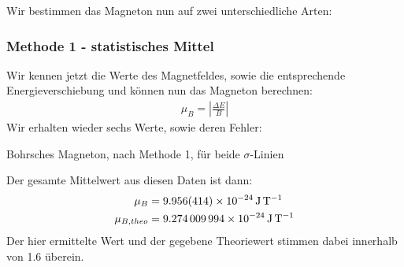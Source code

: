         Wir bestimmen das Magneton nun auf zwei unterschiedliche Arten:

        \subsubsection{Methode 1 - statistisches Mittel}
          Wir kennen jetzt die Werte des Magnetfeldes, sowie die entsprechende Energieverschiebung und können nun das Magneton berechnen:
          \begin{align}
            \mu_B=\left| \frac{\Delta E}{B} \right|
          \end{align}
          Wir erhalten wieder sechs Werte, sowie deren Fehler:
          \begin{table}[H]
            \centering
            
            \caption{Bohrsches Magneton, nach Methode 1, für beide $\sigma$-Linien}
            \label{tab::2}
          \end{table}
          Der gesamte Mittelwert aus diesen Daten ist dann:
          \begin{align}
            \mu_B         &= \SI{9.956+-0.414e-24}{\joule\per\tesla}\\
            \mu_{B, theo} &= \SI{9.274009994e-24}{\joule\per\tesla}%
          \end{align}
          Der hier ermittelte Wert und der gegebene Theoriewert stimmen dabei innerhalb von \SI{1.6}{\sigma} überein.


